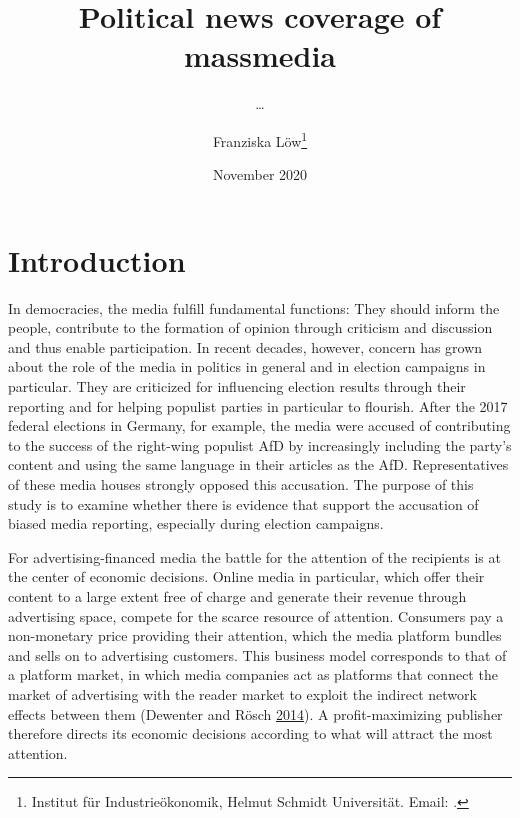 \documentclass[
]{article}
\title{Political news coverage of massmedia}
\subtitle{\ldots{}}
\author{Franziska Löw\footnote{Institut für Industrieökonomik, Helmut Schmidt
  Universität. Email: .}}
\date{November 2020}
\begin{document}
\maketitle

\hypertarget{introduction}{%
\section{Introduction}\label{introduction}}

In democracies, the media fulfill fundamental functions: They should
inform the people, contribute to the formation of opinion through
criticism and discussion and thus enable participation. In recent
decades, however, concern has grown about the role of the media in
politics in general and in election campaigns in particular. They are
criticized for influencing election results through their reporting and
for helping populist parties in particular to flourish. After the 2017
federal elections in Germany, for example, the media were accused of
contributing to the success of the right-wing populist AfD by
increasingly including the party's content and using the same language
in their articles as the AfD. Representatives of these media houses
strongly opposed this accusation. The purpose of this study is to
examine whether there is evidence that support the accusation of biased
media reporting, especially during election campaigns.

For advertising-financed media the battle for the attention of the
recipients is at the center of economic decisions. Online media in
particular, which offer their content to a large extent free of charge
and generate their revenue through advertising space, compete for the
scarce resource of attention. Consumers pay a non-monetary price
providing their attention, which the media platform bundles and sells on
to advertising customers. This business model corresponds to that of a
platform market, in which media companies act as platforms that connect
the market of advertising with the reader market to exploit the indirect
network effects between them (Dewenter and Rösch
\protect\hyperlink{ref-dewenter_einfuhrung_2014}{2014}). A
profit-maximizing publisher therefore directs its economic decisions
according to what will attract the most attention.
\end{document}
